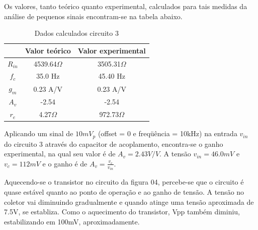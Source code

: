 \documentclass[a4paper]{article} %
\begin{document}
%
Os valores, tanto teórico quanto experimental, calculados para tais medidas da análise
de pequenos sinais encontram-se na tabela abaixo.
\begin{table}[h!]
\begin{centering}
\begin{tabular}{ccc}
\hline 
 & Valor teórico & Valor experimental\tabularnewline
\hline
\hline 
$R_{in}$ & 4539.64$\Omega$ & 3505.31$\Omega$\tabularnewline
$f_{c}$ & 35.0 Hz & 45.40 Hz\tabularnewline
$g_{m}$ & 0.23 A/V & 0.23 A/V\tabularnewline
$A_{v}$ & -2.54 & -2.54\tabularnewline
$r_{e}$ & 4.27$\Omega$ & 972.73$\Omega$\tabularnewline
\hline
\end{tabular}
\par\end{centering}

\caption{Dados calculados circuito 3}

\end{table}



Aplicando um sinal de $10mV_p$ (offset = 0 e freqüência = 10kHz) na entrada $v_{in}$
do circuito 3 através do capacitor de acoplamento, encontra-se o ganho experimental, na qual seu
valor é de $A_v=2.43V/V$. A tensão  $v_{in}=46.0mV$ e  $v_c=112mV$ e o ganho é de $A_v=\frac{v_c}{v_{in}}$.

Aquecendo-se o transistor no circuito da figura 04, percebe-se que o circuito é quase
estável quanto ao ponto de operação e ao ganho de tensão. A tensão no coletor vai
diminuindo gradualmente e quando atinge uma tensão aproximada de 7.5V,
se establiza.
Como o aquecimento do transistor, Vpp também diminiu, estabilizando em 100mV,
aproximadamente.











\end{document}
